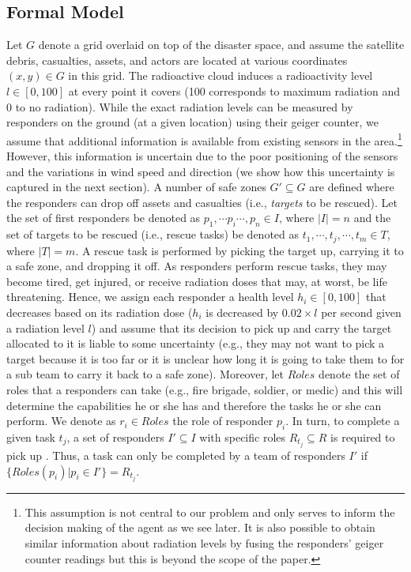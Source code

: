 \subsection{Formal Model}
\noindent Let $G$ denote a grid overlaid on top of the disaster space, and assume the satellite debris, casualties, assets, and actors are located at various coordinates $(x,y) \in G$ in this grid. The radioactive cloud induces a radioactivity level  $l \in [0,100]$ at every point it covers (100 corresponds to maximum radiation and 0 to no radiation). While the exact radiation levels can be measured by responders on the ground (at a given location) using their geiger counter, we assume that additional information is available  from existing sensors  in the area.\footnote{This assumption is not central to our problem and only serves to inform the decision making of the agent as we see later. It is also possible to obtain similar information about radiation levels by fusing the responders' geiger counter readings but this is beyond the scope of the paper.} However, this information is uncertain due to the poor positioning of the sensors and the variations in wind speed and direction (we show how this uncertainty is captured in the next section). A number of safe zones $G' \subseteq G$ are defined where the responders can drop off assets and casualties (i.e., \emph{targets} to be rescued). Let the set of first responders be denoted as $p_1, \cdots p_i \cdots, p_n \in I$, where $|I| = n$ and the set of  targets to be rescued (i.e., rescue tasks) be denoted as  $t_1,\cdots, t_j, \cdots, t_m\in T$, where $|T| = m$. A rescue task is performed by picking the target up, carrying it to a safe zone, and dropping it off.  As responders perform rescue tasks, they may become tired, get injured, or receive radiation doses that may, at worst, be life threatening. Hence, we assign each responder  a health level $h_i\in [0,100]$ that decreases based on its radiation dose ($h_i$ is decreased by $0.02 \times l$ per second given a radiation level $l$) and assume that its decision to pick up and carry the target allocated to it is liable to some uncertainty (e.g., they may not want to pick a target because it is too far or it is unclear how long it is going to take them to for a sub team to carry it back  to a safe zone).  Moreover, let $Roles$ denote the set of roles that a responders can take (e.g., fire brigade, soldier, or medic)  and this will determine the capabilities he or she has and therefore the tasks he or she can perform. We denote as $r_i \in Roles$ the role of responder $p_i$. In turn, to complete a given task $t_j$,  a set of responders $I' \subseteq I$ with specific roles $R_{t_j} \subseteq R$ is required to pick up . Thus, a task can only be completed by a team of responders $I'$ if $\{Roles(p_i) | p_i \in I'\} = R_{t_j}$.
%
